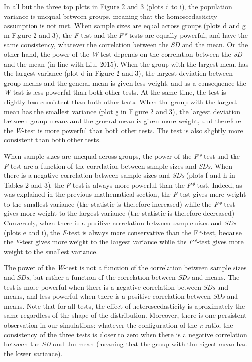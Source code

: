 \documentclass[man,floatsintext]{apa6}
\begin{document}
In all but the three top plots in Figure 2 and 3 (plots d to i), the population variance is unequal between groups, meaning that the homoscedasticity assumption is not met. When sample sizes are equal across groups (plots d and g in Figure 2 and 3), the \emph{F}-test and the \emph{F*}-tests are equally powerful, and have the same consistency, whatever the correlation between the \emph{SD} and the mean. On the other hand, the power of the \emph{W}-test depends on the correlation between the \emph{SD} and the mean (in line with Liu, 2015). When the group with the largest mean has the largest variance (plot d in Figure 2 and 3), the largest deviation between group means and the general mean is given less weight, and as a consequence the \emph{W}-test is less powerful than both other tests. At the same time, the test is slightly less consistent than both other tests. When the group with the largest mean has the smallest variance (plot g in Figure 2 and 3), the largest deviation between group means and the general mean is given more weight, and therefore the \emph{W}-test is more powerful than both other tests. The test is also slightly more consistent than both other tests.

When sample sizes are unequal across groups, the power of the \emph{F*}-test and the \emph{F}-test are a function of the correlation between sample sizes and \emph{SDs}. When there is a negative correlation between sample sizes and \emph{SDs} (plots f and h in Tables 2 and 3), the \emph{F}-test is always more powerful than the \emph{F*}-test. Indeed, as was explained in the previous mathematical section, the \emph{F}-test gives more weight to the smallest variance (the statistic is therefore increased) while the \emph{F*}-test gives more weight to the largest variance (the statistic is therefore decreased). Conversely, when there is a positive correlation between sample sizes and \emph{SDs} (plots e and i), the \emph{F}-test is always more conservative than the F\emph{*}-test, because the \emph{F}-test gives more weight to the largest variance while the \emph{F*}-test gives more weight to the smallest variance.

The power of the \emph{W}-test is not a function of the correlation between sample sizes and \emph{SDs}, but rather a function of the correlation between \emph{SDs} and means. The test is more powerful when there is a negative correlation between \emph{SDs} and means, and less powerful when there is a positive correlation between \emph{SDs} and means. Note that for all tests, the effect of heteroscedasticity is aproximately the same regardless of the shape of the distribution. Moreover, there is one persistent observation in our simulations: whatever the configuration of the \emph{n}-ratio, the consistency of the three tests is closer to zero when there is a negative correlation between the \emph{SD} and the mean (meaning that the group with the higest mean has the lower variance).
\end{document}
